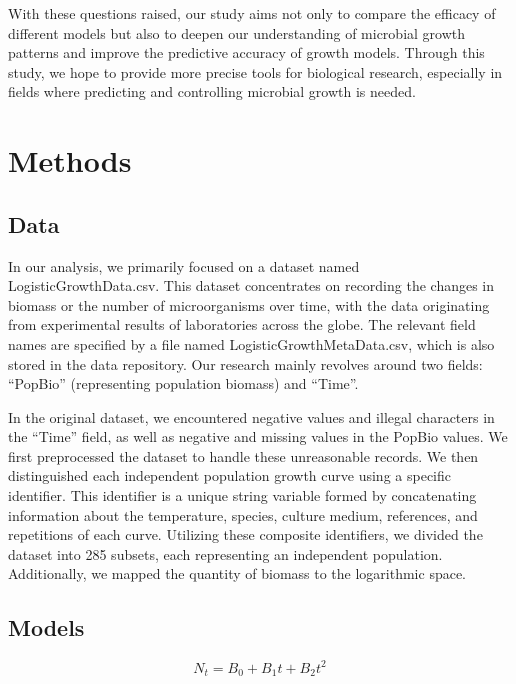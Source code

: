 \documentclass[11pt]{article}
\begin{document}
\begin{linenumbers}
With these questions raised, our study aims not only to compare the efficacy of different models but also to deepen our understanding of microbial growth patterns and improve the predictive accuracy of growth models. Through this study, we hope to provide more precise tools for biological research, especially in fields where predicting and controlling microbial growth is needed.


    \section{Methods}

        \subsection{Data}

In our analysis, we primarily focused on a dataset named LogisticGrowthData.csv. This dataset concentrates on recording the changes in biomass or the number of microorganisms over time, with the data originating from experimental results of laboratories across the globe. The relevant field names are specified by a file named LogisticGrowthMetaData.csv, which is also stored in the data repository. Our research mainly revolves around two fields: ``PopBio'' (representing population biomass) and ``Time''.

In the original dataset, we encountered negative values and illegal characters in the ``Time'' field, as well as negative and missing values in the PopBio values. We first preprocessed the dataset to handle these unreasonable records. We then distinguished each independent population growth curve using a specific identifier. This identifier is a unique string variable formed by concatenating information about the temperature, species, culture medium, references, and repetitions of each curve. Utilizing these composite identifiers, we divided the dataset into 285 subsets, each representing an independent population. Additionally, we mapped the quantity of biomass to the logarithmic space.


        \subsection{Models}

            \begin{equation}
                N_t = B_0 + B_1 t + B_2 t^2
                \label{eq:quadratic}
            \end{equation}
            

\end{linenumbers}
\end{document}
